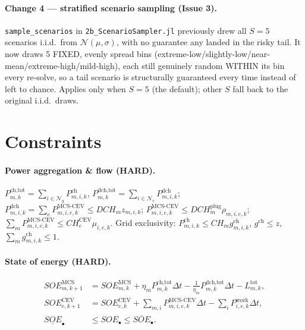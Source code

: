 \documentclass[11pt]{article}
\newcommand{\dt}{\Delta t}
\begin{document}
\paragraph{Change 4 --- stratified scenario sampling (Issue 3).} \texttt{sample\_scenarios} in
\texttt{2b\_ScenarioSampler.jl} previously drew all $S=5$ scenarios i.i.d.\ from
$\mathcal{N}(\mu,\sigma)$, with no guarantee any landed in the risky tail. It now draws 5 FIXED,
evenly spread bins (extreme-low/slightly-low/near-mean/extreme-high/mild-high), each still
genuinely random WITHIN its bin every re-solve, so a tail scenario is structurally guaranteed every
time instead of left to chance. Applies only when $S=5$ (the default); other $S$ fall back to the
original i.i.d.\ draws.


\section{Constraints}

\paragraph{Power aggregation \& flow (HARD).}
$P^{\text{ch,tot}}_{m,k}=\sum_{i\in\mathcal{N}_g}P^{\text{ch}}_{m,i,k}$,
$P^{\text{dch,tot}}_{m,k}=\sum_{i\in\mathcal{N}_c}P^{\text{dch}}_{m,i,k}$;
$P^{\text{dch}}_{m,i,k}=\sum_e P^{\text{MCS-CEV}}_{m,i,e,k}\le DCH_m z_{m,i,k}$;
$P^{\text{MCS-CEV}}_{m,i,e,k}\le DCH^{\text{plug}}_m\rho_{m,i,e,k}$;
$\sum_m P^{\text{MCS-CEV}}_{m,i,e,k}\le CH^{\text{CEV}}_e\mu_{i,e,k}$.
Grid exclusivity: $P^{\text{ch}}_{m,i,k}\le CH_m g^{\text{ch}}_{m,i,k}$,
$g^{\text{ch}}\le z$, $\sum_m g^{\text{ch}}_{m,i,k}\le 1$.

\paragraph{State of energy (HARD).}
\begin{align}
SOE^{\text{MCS}}_{m,k+1}&=SOE^{\text{MCS}}_{m,k}+\eta_m P^{\text{ch,tot}}_{m,k}\dt-\tfrac{1}{\eta_m}P^{\text{dch,tot}}_{m,k}\dt-L^{\text{tot}}_{m,k},\\
SOE^{\text{CEV}}_{e,k+1}&=SOE^{\text{CEV}}_{e,k}+\textstyle\sum_{m,i}P^{\text{MCS-CEV}}_{m,i,e,k}\dt-\sum_i P^{\text{work}}_{i,e,k}\dt,\\
\underline{SOE}_\bullet&\le SOE_\bullet\le\overline{SOE}_\bullet .
\end{align}
\end{document}

